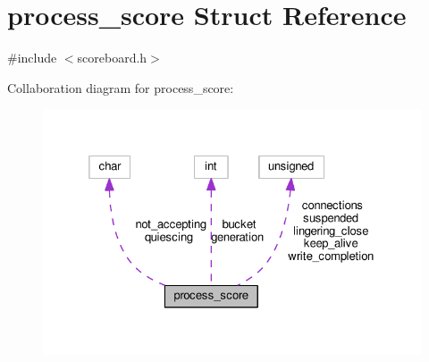 \hypertarget{structprocess__score}{}\section{process\+\_\+score Struct Reference}
\label{structprocess__score}


{\ttfamily \#include $<$scoreboard.\+h$>$}



Collaboration diagram for process\+\_\+score\+:
\nopagebreak
\begin{figure}[H]
\begin{center}
\leavevmode
\includegraphics[width=325pt]{structprocess__score__coll__graph}
\end{center}
\end{figure}
